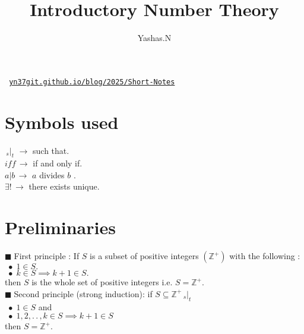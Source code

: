 \documentclass[11pt]{extarticle}
\author{Yashas.N \\
}
\title{Introductory Number Theory
}
\date{}
\newcommand{\ra}{\rightarrow}
\newcommand{\Z}{\mathbb{Z}}
\newcommand{\ck}{.\,.\,}
\newcommand{\st}{\,{}_{s}|_t\,}
\newcommand{\tbx}[2][]{
\begin{tcolorbox}[enhanced,breakable,size=small,colback=black!2!white,title={#1},arc is angular, arc=1.5mm,
	drop fuzzy shadow]
	#2
\end{tcolorbox}
}
\newcommand{\y}{$\blacksquare\;$}
\newcommand{\yi}{\indent$\;\bullet\;$}
\begin{document}
\maketitle
\begin{center}\texttt{
\href{https://yn37git.github.io/blog/2025/Short-Notes/}{yn37git.github.io/blog/2025/Short-Notes}}
\end{center} 

\begin{multicols}{2}
	\tableofcontents

\section*{Symbols used}
	\begin{center}
	$ \st \, \ra  $ such that.\\
	$ iff\,\ra $ if and only if.\\
	$ a|b \, \ra  $ $ a $ divides $ b $ .\\
	$ \exists! \, \ra  $ there exists unique.\\
	
\end{center}
\newcolumn
\section{Preliminaries}
\tbx[Principle of Mathematical induction]{
\y First principle :  If $ S $ is a subset of positive integers $ (\Z^+) $ with the following :\\
\yi $ 1\in S. $ \\
\yi $ k\in S \implies k+1\in S. $ \\
then $ S $ is the whole set of positive integers i.e. $ S=\Z^+. $\\
\y Second principle (strong induction): if $ S \subseteq \Z^+ \st $\\
\yi $ 1\in S $ and \\
\yi $ 1,2,\ck,k\in S  \implies k+1\in S$ \\
then $ S=\Z^+ .$  }

\end{multicols}
\end{document}
